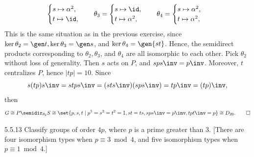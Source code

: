 \begin{sol}
\begin{itemize}
\[\begin{cases}
                s \mapsto \alpha^2, \\
                t \mapsto \id,
            \end{cases} \quad
            \theta_3 = 
            \begin{cases}
                s \mapsto \id, \\
                t \mapsto \alpha^2,
            \end{cases} \quad
            \theta_4 =
            \begin{cases}
                s \mapsto \alpha^2, \\
                t \mapsto \alpha^2,
            \end{cases}
        \]
        This is the same situation as in the previous exercise, since $\ker\theta_2 = \gen t, \ker\theta_3 = \gen s$, and $\ker\theta_4 = \gen{st}$.
        Hence, the semidirect products corresponding to $\theta_2, \theta_3$, and $\theta_4$ are all isomorphic to each other.
        Pick $\theta_2$ without loss of generality.
        Then $s$ acts on $P$, and $sps\inv = p\inv$.
        Moreover, $t$ centralizes $P$, hence $|tp| = 10$.
        Since
        \[
        	s(tp)s\inv = stps\inv = (sts\inv)(sps\inv) = tp\inv = (tp)\inv,
        \]
        then
        \[
        	G \cong P \semidir_{\theta_2} S \cong \set{p, s, t \mid p^5 = s^2 = t^2 = 1, st = ts, sps\inv = p\inv, tpt\inv = p} \cong D_{20}. \qedhere
        \]
    \end{itemize}
\end{sol}

\begin{exercise}{5.5.13}
    Classify groups of order $4p$, where $p$ is a prime greater than 3. [There are four isomorphism types when $p \equiv 3 \bmod 4$, and five isomorphism types when $p \equiv 1 \bmod 4$.]
\end{exercise}

